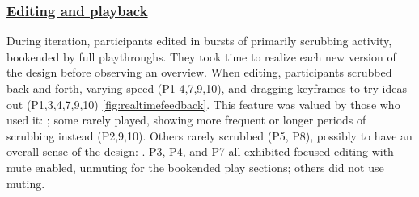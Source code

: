 \subsubsection{\underline{Editing and playback}}
During iteration, participants edited in bursts of primarily scrubbing activity, bookended by full playthroughs.
They took time to realize each new version of the design before observing an overview.
   		When editing, participants scrubbed back-and-forth, varying speed (P1-4,7,9,10), and dragging keyframes to try ideas out (P1,3,4,7,9,10) \autoref{fig:realtimefeedback}.
    This feature was valued by those who used it: ;
    some rarely played, showing more frequent or longer periods of scrubbing instead (P2,9,10).
    Others rarely scrubbed (P5, P8), possibly to have an overall sense of the design: .
            	P3, P4, and P7 all exhibited focused editing with mute enabled, unmuting for the bookended play sections; others did not use muting.



